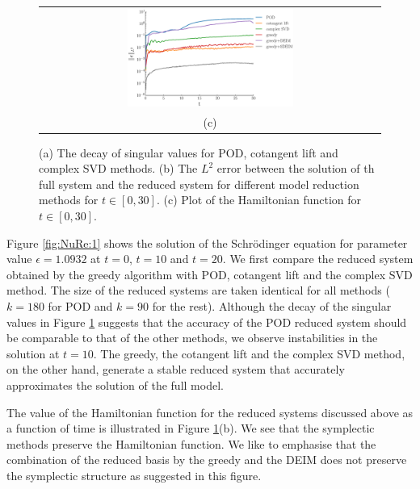 \begin{figure}[t] 
\begin{center}
\begin{tabular}{c}
	\includegraphics[width=0.5\textwidth]{./figs/schrodinger/error} \\
	(c)
\end{tabular}
\end{center}
\caption{(a) The decay of singular values for POD, cotangent lift and complex SVD methods. (b) The $L^2$ error between the solution of th full system and the reduced system for different model reduction methods for $t \in [0,30]$. (c) Plot of the Hamiltonian function for $t \in [0,30]$.}\label{fig:NuRe:2}
\end{figure}

  



Figure \ref{fig:NuRe:1} shows the solution of the Schr\"odinger equation for parameter value $\epsilon = 1.0932$ at $t=0$, $t=10$ and $t=20$. We first compare the reduced system obtained by the greedy algorithm with POD, cotangent lift and the complex SVD method. The size of the reduced systems are taken identical for all methods ($k=180$ for POD and $k=90$ for the rest). Although the decay of the singular values in Figure \ref{fig:NuRe:2} suggests that the accuracy of the POD reduced system should be comparable to that of the other methods, we observe instabilities in the solution at $t=10$. The greedy, the cotangent lift and the complex SVD method, on the other hand, generate a stable reduced system that accurately approximates the solution of the full model.

The value of the Hamiltonian function for the reduced systems discussed above as a function of time is illustrated in Figure \ref{fig:NuRe:2}(b). We see that the symplectic methods preserve the Hamiltonian function. We like to emphasise that the combination of the reduced basis by the greedy and the DEIM does not preserve the symplectic structure as suggested in this figure.

